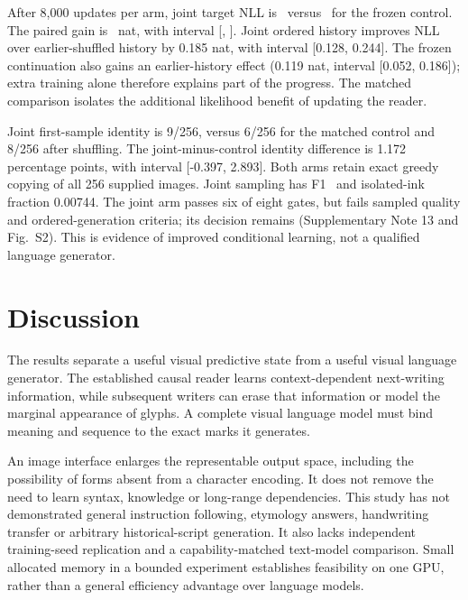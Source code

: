 After 8,000 updates per arm, joint target NLL is \JointNll\ versus
\ControlNll\ for the frozen control. The paired gain is \JointNllGain\ nat,
with interval [\JointNllLow, \JointNllHigh]. Joint ordered history improves
NLL over earlier-shuffled history by 0.185 nat, with interval [0.128, 0.244].
The frozen continuation also gains an earlier-history effect (0.119 nat,
interval [0.052, 0.186]); extra training alone therefore explains part of the
progress. The matched comparison isolates the additional likelihood benefit
of updating the reader.

Joint first-sample identity is 9/256, versus 6/256 for the matched control and
8/256 after shuffling. The joint-minus-control identity difference is 1.172
percentage points, with interval [-0.397, 2.893]. Both arms retain exact greedy
copying of all 256 supplied images. Joint sampling has F1 \JointSampleFone\
and isolated-ink fraction 0.00744. The joint arm passes six of eight gates,
but fails sampled quality and ordered-generation criteria; its decision remains
\texttt{\JointDecision} (Supplementary Note 13 and Fig.~S2).
This is evidence of improved conditional learning, not a qualified language
generator.

\section*{Discussion}
The results separate a useful visual predictive state from a useful visual
language generator. The established causal reader learns context-dependent
next-writing information, while subsequent writers can erase that information
or model the marginal appearance of glyphs. A complete visual language model
must bind meaning and sequence to the exact marks it generates.

An image interface enlarges the representable output space, including the
possibility of forms absent from a character encoding. It does not remove the
need to learn syntax, knowledge or long-range dependencies. This study has not
demonstrated general instruction following, etymology answers, handwriting
transfer or arbitrary historical-script generation. It also lacks independent
training-seed replication and a capability-matched text-model comparison.
Small allocated memory in a bounded experiment establishes feasibility on one
GPU, rather than a general efficiency advantage over language models.

